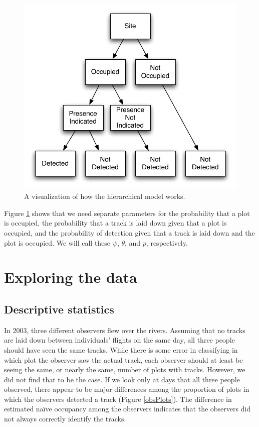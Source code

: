\documentclass[12pt]{article}
\begin{document}
    \begin{figure}
    \begin{center}
        \includegraphics[scale=0.75]{SimpleHierarchicalModel}
        \caption{A visualization of how the hierarchical model works.}
        \label{simplehierarchicalmodel}
    \end{center}
    \end{figure}

    Figure \ref{simplehierarchicalmodel} shows that we need separate parameters
    for the
    probability that a plot is occupied, the probability that a track is laid
    down given that a plot is occupied, and the probability of detection
    given that a track is laid down and the plot is occupied. We will call
    these \(\psi\), \(\theta\), and \(p\), respectively.

\section{Exploring the data}

    \subsection{Descriptive statistics}
    In 2003, three different observers flew over the rivers. Assuming that no
    tracks are laid down between individuals' flights on the same day, all three
    people should have seen the same tracks. While there is some error in
    classifying in which plot the observer saw the actual track, each observer
    should at least be seeing the same, or nearly the same, number of plots with
    tracks. However, we did not find that to be the case. If we look only at
    days that all three people observed, there appear to be major differences
    among the proportion of plots in which the observers detected a track
    (Figure \ref{obsPlots}). The difference in estimated na\"ive occupancy among
    the
    observers indicates that the observers did not always correctly identify
    the tracks.
\end{document}

